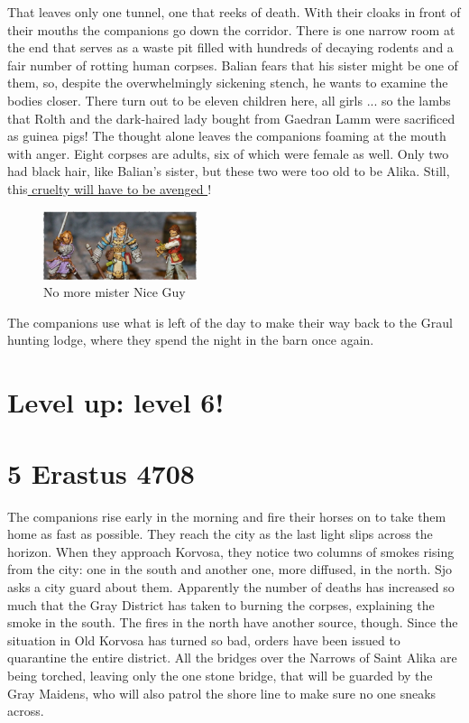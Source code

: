 That leaves only one tunnel, one that reeks of death. With their cloaks in front of their mouths the companions go down the corridor. There is one narrow room at the end that serves as a waste pit filled with hundreds of decaying rodents and a fair number of rotting human corpses. Balian fears that his sister might be one of them, so, despite the overwhelmingly sickening stench, he wants to examine the bodies closer. There turn out to be eleven children here, all girls ... so the lambs that Rolth and the dark-haired lady bought from Gaedran Lamm were sacrificed as guinea pigs! The thought alone leaves the companions foaming at the mouth with anger. Eight corpses are adults, six of which were female as well. Only two had black hair, like Balian's sister, but these two were too old to be Alika. Still, this\hyperref[fig:No-more-mister-Nice-Guy-515533807]{ cruelty will have to be avenged } ! \\

\begin{figure}[h]
	\centering
	\includegraphics[width=0.4\textwidth]{images/No-more-mister-Nice-Guy-515533807_mod.jpg}
	\caption{No more mister Nice Guy}
	\label{fig:No-more-mister-Nice-Guy-515533807}
\end{figure}

The companions use what is left of the day to make their way back to the Graul hunting lodge, where they spend the night in the barn once again.\\

\section{Level up: level 6!}

\section{5 Erastus 4708}

The companions rise early in the morning and fire their horses on to take them home as fast as possible. They reach the city as the last light slips across the horizon. When they approach Korvosa, they notice two columns of smokes rising from the city: one in the south and another one, more diffused, in the north. Sjo asks a city guard about them. Apparently the number of deaths has increased so much that the Gray District has taken to burning the corpses, explaining the smoke in the south. The fires in the north have another source, though. Since the situation in Old Korvosa has turned so bad, orders have been issued to quarantine the entire district. All the bridges over the Narrows of Saint Alika are being torched, leaving only the one stone bridge, that will be guarded by the Gray Maidens, who will also patrol the shore line to make sure no one sneaks across.\\

